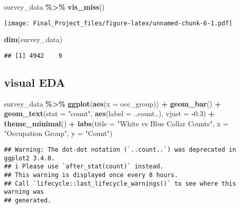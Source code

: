 \documentclass[
]{article}
\newenvironment{Shaded}{\begin{snugshade}}{\end{snugshade}}
\newcommand{\AttributeTok}[1]{\textcolor[rgb]{0.13,0.29,0.53}{#1}}
\newcommand{\FloatTok}[1]{\textcolor[rgb]{0.00,0.00,0.81}{#1}}
\newcommand{\FunctionTok}[1]{\textcolor[rgb]{0.13,0.29,0.53}{\textbf{#1}}}
\newcommand{\NormalTok}[1]{#1}
\newcommand{\SpecialCharTok}[1]{\textcolor[rgb]{0.81,0.36,0.00}{\textbf{#1}}}
\newcommand{\StringTok}[1]{\textcolor[rgb]{0.31,0.60,0.02}{#1}}
\begin{document}
\begin{Shaded}
\begin{Highlighting}[]
\NormalTok{survey\_data }\SpecialCharTok{\%\textgreater{}\%}
  \FunctionTok{vis\_miss}\NormalTok{()}
\end{Highlighting}
\end{Shaded}

\texttt{[image: Final\_Project\_files/figure-latex/unnamed-chunk-6-1.pdf]}

\begin{Shaded}
\begin{Highlighting}[]
\FunctionTok{dim}\NormalTok{(survey\_data)}
\end{Highlighting}
\end{Shaded}

\begin{verbatim}
## [1] 4942    9
\end{verbatim}

\subsection{visual EDA}\label{visual-eda}

\begin{Shaded}
\begin{Highlighting}[]
\NormalTok{survey\_data }\SpecialCharTok{\%\textgreater{}\%}
  \FunctionTok{ggplot}\NormalTok{(}\FunctionTok{aes}\NormalTok{(}\AttributeTok{x =}\NormalTok{ occ\_group)) }\SpecialCharTok{+}
  \FunctionTok{geom\_bar}\NormalTok{() }\SpecialCharTok{+}
  \FunctionTok{geom\_text}\NormalTok{(}\AttributeTok{stat =} \StringTok{"count"}\NormalTok{, }\FunctionTok{aes}\NormalTok{(}\AttributeTok{label =}\NormalTok{ ..count..), }\AttributeTok{vjust =} \SpecialCharTok{{-}}\FloatTok{0.3}\NormalTok{) }\SpecialCharTok{+}
  \FunctionTok{theme\_minimal}\NormalTok{() }\SpecialCharTok{+}
  \FunctionTok{labs}\NormalTok{(}\AttributeTok{title =} \StringTok{"White vs Blue Collar Counts"}\NormalTok{, }\AttributeTok{x =} \StringTok{"Occupation Group"}\NormalTok{, }\AttributeTok{y =} \StringTok{"Count"}\NormalTok{)}
\end{Highlighting}
\end{Shaded}

\begin{verbatim}
## Warning: The dot-dot notation (`..count..`) was deprecated in ggplot2 3.4.0.
## i Please use `after_stat(count)` instead.
## This warning is displayed once every 8 hours.
## Call `lifecycle::last_lifecycle_warnings()` to see where this warning was
## generated.
\end{verbatim}
\end{document}

